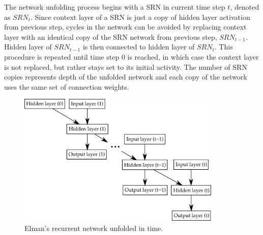 \documentclass[12pt,oneside]{fithesis2}
\begin{document}
The network unfolding process begins with a SRN in current time step $t$, denoted as $SRN_t$. Since context layer of a SRN is just a copy of hidden layer activation from previous step, cycles in the network can be avoided by replacing context layer with an identical copy of the SRN network from previous step, $SRN_{t-1}$. Hidden layer of $SRN_{t-1}$ is then connected to hidden layer of $SRN_t$. This procedure is repeated until time step $0$ is reached, in which case the context layer is not replaced, but rather stays set to its initial activity. The number of SRN copies represents depth of the unfolded network and each copy of the network uses the same set of connection weights.\par

	\begin{figure}[ht]
		\centering
		\includegraphics[width=367px]{bptt2.png}
		\caption{Elman's recurrent network unfolded in time. }
		\label{unfolding}
		\label{fig:bptt}
	\end{figure}
\end{document}
